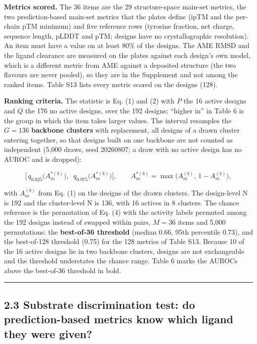\documentclass[
  10pt,
]{article}
\DeclareRobustCommand{\_}{\textunderscore\hspace{0pt}}
\begin{document}
\textbf{Metrics
scored.} The 36
items are the 29
structure-space
main-set metrics,
the two
prediction-based
main-set metrics
that the plates
define (ipTM and the
per-chain pTM
minimum) and five
reference rows
(tyrosine fraction,
net charge, sequence
length, pLDDT and
pTM; designs have no
crystallographic
resolution). An item
must have a value on
at least 80\% of the
designs. The AME
RMSD and the ligand
clearance are
measured on the
plates against each
design's own model,
which is a different
metric from AME
against a deposited
structure (the two
flavours are never
pooled), so they are
in the Supplement
and not among the
ranked items. Table
S13 lists every
metric scored on the
designs (128).

\textbf{Ranking
criteria.} The
statistic is Eq. (1)
and (2) with \(P\)
the 16 active
designs and \(Q\)
the 176 no active
designs, over the
192 designs;
``higher in'' in
Table 6 is the group
in which the item
takes larger values.
The interval
resamples the
\(G = 136\)
\textbf{backbone
clusters} with
replacement, all
designs of a drawn
cluster entering
together, so that
designs built on one
backbone are not
counted as
independent (5,000
draws, seed
20260807; a draw
with no active
design has no AUROC
and is dropped):

\begin{equation*}\Big[\,q_{0.025}\big(A^{*(b)}_m\big),\;\; q_{0.975}\big(A^{*(b)}_m\big)\Big], \qquad A^{*(b)}_m = \max\!\big(A^{(b)}_m,\, 1 - A^{(b)}_m\big), \tag{5}\end{equation*}

with \(A^{(b)}_m\)
from Eq. (1) on the
designs of the drawn
clusters. The
design-level N is
192 and the
cluster-level N is
136, with 16 actives
in 8 clusters. The
chance reference is
the permutation of
Eq. (4) with the
activity labels
permuted among the
192 designs instead
of swapped within
pairs, \(M = 36\)
items and 5,000
permutations: the
\textbf{best-of-36
threshold} (median
0.66, 95th
percentile 0.73),
and the best-of-128
threshold (0.75) for
the 128 metrics of
Table S13. Because
10 of the 16 active
designs lie in two
backbone clusters,
designs are not
exchangeable and the
threshold
understates the
chance range. Table
6 marks the AUROCs
above the best-of-36
threshold in bold.

\begin{center}\rule{0.5\linewidth}{0.5pt}\end{center}

\subsection{2.3
Substrate
discrimination test:
do prediction-based
metrics know which
ligand they were
given?}
\end{document}
